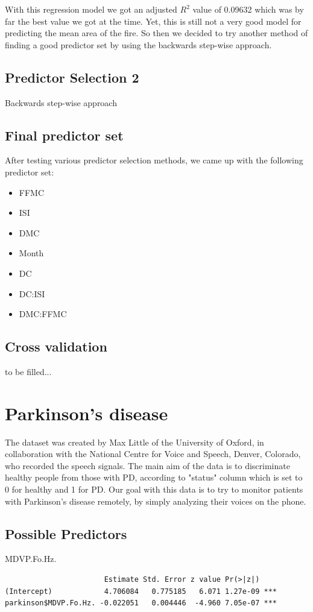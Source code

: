 \documentclass{article}
\begin{document}
With this regression model we got an adjusted $R^{2}$ value of 0.09632 which was by far the best value we got at the time. Yet, this is still not a very good model for predicting the mean area of the fire. So then we decided to try another method of finding a good predictor set by using the backwards step-wise approach.

\subsection{Predictor Selection 2}
Backwards step-wise approach

\subsection{Final predictor set}

After testing various predictor selection methods, we came up with the following predictor set:
\begin{itemize}
	\item FFMC
	\item ISI
	\item DMC
	\item Month
	\item DC
	\item DC:ISI
	\item DMC:FFMC
\end{itemize}

\subsection{Cross validation}

to be filled...


\section{Parkinson's disease}

The dataset was created by Max Little of the University of Oxford, in collaboration with the
National Centre for Voice and Speech, Denver, Colorado, who recorded the speech signals. The
main aim of the data is to discriminate healthy people from those with PD, according to
"status" column which is set to 0 for healthy and 1 for PD. Our goal with this data is to
try to monitor patients with Parkinson's disease remotely, by simply analyzing their voices
on the phone.

\subsection{Possible Predictors}
MDVP.Fo.Hz.
\begin{verbatim}
                       Estimate Std. Error z value Pr(>|z|)    
(Intercept)            4.706084   0.775185   6.071 1.27e-09 ***
parkinson$MDVP.Fo.Hz. -0.022051   0.004446  -4.960 7.05e-07 ***
\end{verbatim}
\end{document}
